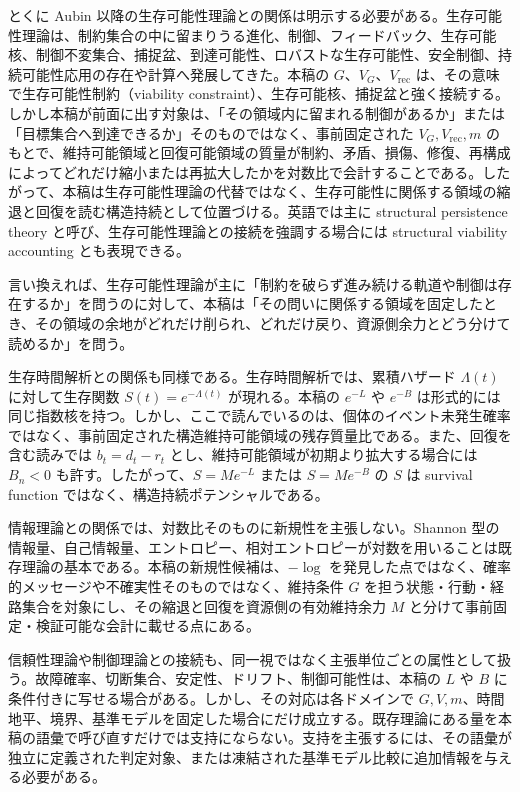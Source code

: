 \documentclass[12pt,a4paper]{article}
\begin{document}
とくに Aubin 以降の生存可能性理論との関係は明示する必要がある。生存可能性理論は、制約集合の中に留まりうる進化、制御、フィードバック、生存可能核、制御不変集合、捕捉盆、到達可能性、ロバストな生存可能性、安全制御、持続可能性応用の存在や計算へ発展してきた。本稿の \(G\)、\(V_{G}\)、\(V_{\mathrm{rec}}\) は、その意味で生存可能性制約（viability constraint）、生存可能核、捕捉盆と強く接続する。しかし本稿が前面に出す対象は、「その領域内に留まれる制御があるか」または「目標集合へ到達できるか」そのものではなく、事前固定された \(V_{G},V_{\mathrm{rec}},m\) のもとで、維持可能領域と回復可能領域の質量が制約、矛盾、損傷、修復、再構成によってどれだけ縮小または再拡大したかを対数比で会計することである。したがって、本稿は生存可能性理論の代替ではなく、生存可能性に関係する領域の縮退と回復を読む構造持続として位置づける。英語では主に structural persistence theory と呼び、生存可能性理論との接続を強調する場合には structural viability accounting とも表現できる。

言い換えれば、生存可能性理論が主に「制約を破らず進み続ける軌道や制御は存在するか」を問うのに対して、本稿は「その問いに関係する領域を固定したとき、その領域の余地がどれだけ削られ、どれだけ戻り、資源側余力とどう分けて読めるか」を問う。

生存時間解析との関係も同様である。生存時間解析では、累積ハザード \(\Lambda(t)\) に対して生存関数 \(S(t)=e^{-\Lambda(t)}\) が現れる。本稿の \(e^{-L}\) や \(e^{-B}\) は形式的には同じ指数核を持つ。しかし、ここで読んでいるのは、個体のイベント未発生確率ではなく、事前固定された構造維持可能領域の残存質量比である。また、回復を含む読みでは \(b_{t}=d_{t}-r_{t}\) とし、維持可能領域が初期より拡大する場合には \(B_{n}<0\) も許す。したがって、\(S=Me^{-L}\) または \(S=Me^{-B}\) の \(S\) は survival function ではなく、構造持続ポテンシャルである。

情報理論との関係では、対数比そのものに新規性を主張しない。Shannon 型の情報量、自己情報量、エントロピー、相対エントロピーが対数を用いることは既存理論の基本である。本稿の新規性候補は、\(-\log\) を発見した点ではなく、確率的メッセージや不確実性そのものではなく、維持条件 \(G\) を担う状態・行動・経路集合を対象にし、その縮退と回復を資源側の有効維持余力 \(M\) と分けて事前固定・検証可能な会計に載せる点にある。

信頼性理論や制御理論との接続も、同一視ではなく主張単位ごとの属性として扱う。故障確率、切断集合、安定性、ドリフト、制御可能性は、本稿の \(L\) や \(B\) に条件付きに写せる場合がある。しかし、その対応は各ドメインで \(G,V,m\)、時間地平、境界、基準モデルを固定した場合にだけ成立する。既存理論にある量を本稿の語彙で呼び直すだけでは支持にならない。支持を主張するには、その語彙が独立に定義された判定対象、または凍結された基準モデル比較に追加情報を与える必要がある。
\end{document}
